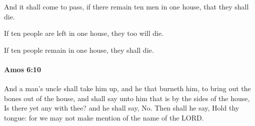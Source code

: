 			\begin{versebox}
					\item[BHS] 
					\item[LXX] 
					\item[ASV] And it shall come to pass, if there remain ten men in one house, that they shall die.
					\item[NIV] If ten people are left in one house, they too will die.
					\item[NRSV] If ten people remain in one house, they shall die.
			\end{versebox}

		\paragraph{Amos 6:10} %
			\label{AMOS-6-10}

			And a man’s uncle shall take him up, and he that burneth him, to bring out the bones out of the house, and shall say unto him that is by the sides of the house, Is there yet any with thee? and he shall say, No. Then shall he say, Hold thy tongue: for we may not make mention of the name of the LORD.

